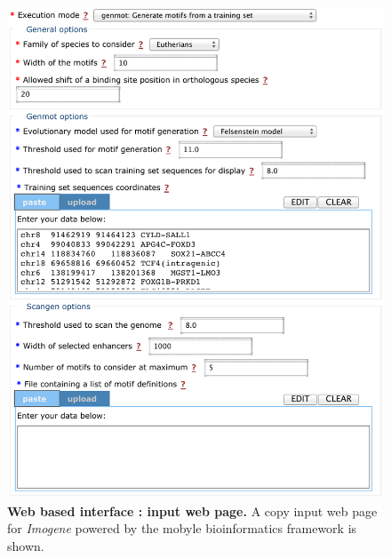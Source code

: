 \documentclass[a4,center,fleqn]{NAR}
\begin{document}
\clearpage
\begin{figure}[!htbp]
\begin{center} 
\includegraphics[width=15cm]{figuresnar-sub/fig6.pdf}
\end{center}
\caption{\normalsize
    {\bf Web based interface : input web page.} A copy 
    input web page for {\em Imogene} powered by the mobyle bioinformatics
    framework is shown. 
    }
    \label{fig:interfacein}
\end{figure}
\end{document}
